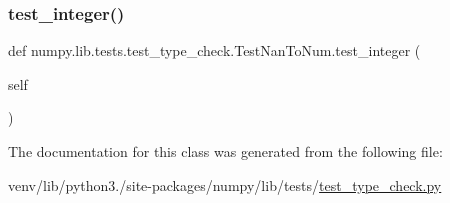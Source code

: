 \subsubsection{\texorpdfstring{test\+\_\+integer()}{test\_integer()}}
{\footnotesize\ttfamily def numpy.\+lib.\+tests.\+test\+\_\+type\+\_\+check.\+Test\+Nan\+To\+Num.\+test\+\_\+integer (\begin{DoxyParamCaption}\item[{}]{self }\end{DoxyParamCaption})}



The documentation for this class was generated from the following file\+:\begin{DoxyCompactItemize}
\item 
venv/lib/python3./site-\/packages/numpy/lib/tests/\hyperlink{test__type__check_8py}{test\+\_\+type\+\_\+check.\+py}\end{DoxyCompactItemize}
